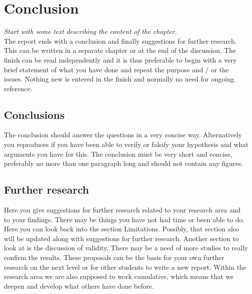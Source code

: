 \chapter{Conclusion}
\emph{Start with some text describing the content of the chapter.}\\

\noindent The report ends with a conclusion and finally suggestions for further research. This can be written in a separate chapter or at the end of the discussion. The finish can be read independently and it is thus preferable to begin with a very brief statement of what you have done and repeat the purpose and / or the issues. Nothing new is entered in the finish and normally no need for ongoing reference.

\section{Conclusions}
The conclusion should answer the questions in a very concise way. Alternatively you reproduces if you have been able to verify or falsify your hypothesis and what arguments you have for this. The conclusion must be very short and concise, preferably no more than one paragraph long and should not contain any figures.

\section{Further research}
Here you give suggestions for further research related to your research area and to your findings. There may be things you have not had time or been able to do. Here you can look back into the section Limitations. Possibly, that section also will be updated along with suggestions for further research. Another section to look at is the discussion of validity. There may be a need of more studies to really confirm the results. These proposals can be the basis for your own further research on the next level or for other students to write a new report. Within the research area we are also supposed to work cumulative, which means that we deepen and develop what others have done before.
